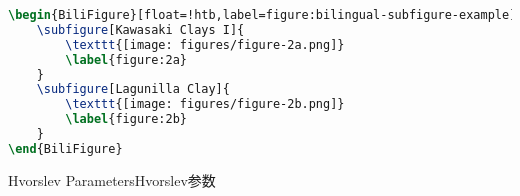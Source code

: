 \begin{lstlisting}[language=LaTeX, caption=Bilingual Subfigure Example, label=listing:bilingual-subfigure-example]
\begin{BiliFigure}[float=!htb,label=figure:bilingual-subfigure-example]{Hvorslev Parameters}{Hvorslev参数}     
    \subfigure[Kawasaki Clays I]{
        \texttt{[image: figures/figure-2a.png]}
        \label{figure:2a}
    }
    \subfigure[Lagunilla Clay]{
        \texttt{[image: figures/figure-2b.png]}
        \label{figure:2b}
    }
\end{BiliFigure}
\end{lstlisting}

\begin{BiliFigure}[float=!htb,label=figure:bilingual-subfigure-example]{Hvorslev Parameters}{Hvorslev参数}     
\end{BiliFigure}